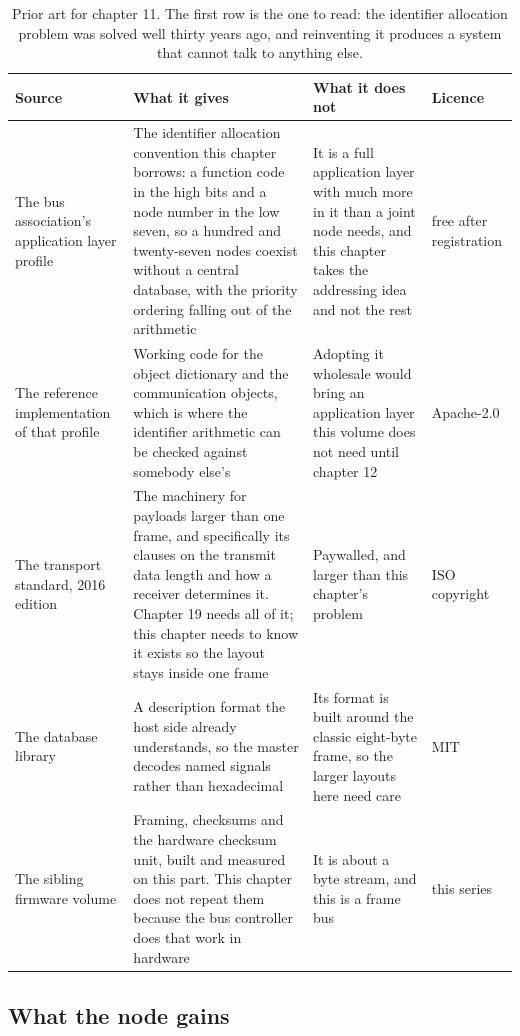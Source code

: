 \begin{table}[H]\centering\small
\begin{tabular}{p{34mm}p{46mm}p{38mm}p{20mm}}
\toprule
Source & What it gives & What it does not & Licence \\
\midrule
The bus association's application layer profile & The identifier allocation convention this chapter borrows: a function code in the high bits and a node number in the low seven, so a hundred and twenty-seven nodes coexist without a central database, with the priority ordering falling out of the arithmetic & It is a full application layer with much more in it than a joint node needs, and this chapter takes the addressing idea and not the rest & free after registration \\
The reference implementation of that profile & Working code for the object dictionary and the communication objects, which is where the identifier arithmetic can be checked against somebody else's & Adopting it wholesale would bring an application layer this volume does not need until chapter 12 & Apache-2.0 \\
The transport standard, 2016 edition & The machinery for payloads larger than one frame, and specifically its clauses on the transmit data length and how a receiver determines it. Chapter 19 needs all of it; this chapter needs to know it exists so the layout stays inside one frame & Paywalled, and larger than this chapter's problem & ISO copyright \\
The database library & A description format the host side already understands, so the master decodes named signals rather than hexadecimal & Its format is built around the classic eight-byte frame, so the larger layouts here need care & MIT \\
The sibling firmware volume & Framing, checksums and the hardware checksum unit, built and measured on this part. This chapter does not repeat them because the bus controller does that work in hardware & It is about a byte stream, and this is a frame bus & this series \\
\bottomrule
\end{tabular}
\caption{Prior art for chapter 11. The first row is the one to read: the identifier allocation problem was solved well thirty years ago, and reinventing it produces a system that cannot talk to anything else.}
\end{table}

\subsection*{What the node gains}

